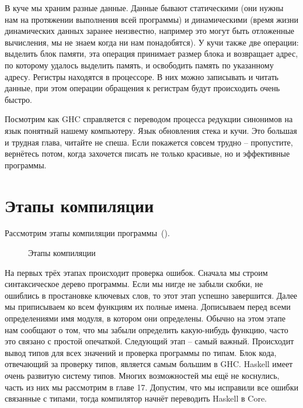 В куче мы храним разные данные. Данные бывают статическими (они нужны
нам на протяжении выполнения всей программы) и динамическими (время
жизни динамических данных заранее неизвестно, например это могут быть
отложенные вычисления, мы не знаем когда ни нам понадобятся). У кучи
также две операции: выделить блок памяти, эта операция принимает размер
блока и возвращает адрес, по которому удалось выделить память, и
освободить память по указанному адресу. Регистры находятся в процессоре.
В них можно записывать и читать данные, при этом операции обращения к
регистрам будут происходить очень быстро.

Посмотрим как GHC справляется с переводом процесса редукции синонимов на
язык понятный нашему компьютеру. Язык обновления стека и кучи. Это
большая и трудная глава, читайте не спеша. Если покажется совсем трудно
-- пропустите, вернётесь потом, когда захочется писать не только
красивые, но и эффективные программы.

\section{Этапы компиляции}

Рассмотрим этапы компиляции программы~().

\begin{figure}[ht]
\centering

\caption{Этапы компиляции}
\label{fig:ghc}
\end{figure}

На первых трёх этапах происходит проверка ошибок. Сначала мы строим
синтаксическое дерево программы. Если мы нигде не забыли скобки, не
ошиблись в простановке ключевых слов, то этот этап успешно завершится.
Далее мы приписываем ко всем функциям их полные имена. Дописываем перед
всеми определениями имя модуля, в котором они определены. Обычно на этом
этапе нам сообщают о том, что мы забыли определить какую-нибудь функцию,
часто это связано с простой опечаткой. Следующий этап -- самый важный.
Происходит вывод типов для всех значений и проверка программы по типам.
Блок кода, отвечающий за проверку типов, является самым большим в GHC.
Haskell имеет очень развитую систему типов. Многих возможностей мы ещё
не коснулись, часть из них мы рассмотрим в главе 17. Допустим, что мы
исправили все ошибки связанные с типами, тогда компилятор начнёт
переводить Haskell в Core.

